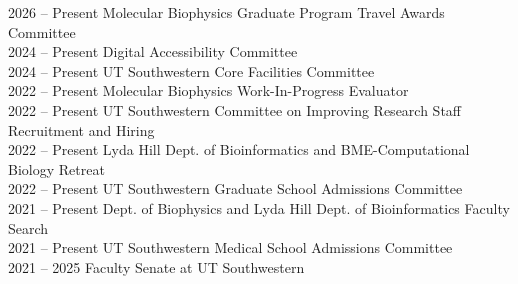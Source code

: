 2026 -- Present \hspace{14pt} Molecular Biophysics Graduate Program Travel Awards Committee \\
2024 -- Present \hspace{14pt} Digital Accessibility Committee \\
2024 -- Present \hspace{14pt} UT Southwestern Core Facilities Committee \\
2022 -- Present \hspace{14pt} Molecular Biophysics Work-In-Progress Evaluator \\
2022 -- Present \hspace{14pt} UT Southwestern Committee on Improving Research Staff Recruitment and Hiring \\
2022 -- Present \hspace{14pt} Lyda Hill Dept. of Bioinformatics and BME-Computational Biology Retreat \\
2022 -- Present \hspace{14pt} UT Southwestern Graduate School Admissions Committee \\
2021 -- Present \hspace{14pt} Dept. of Biophysics and Lyda Hill Dept. of Bioinformatics Faculty Search \\
2021 -- Present \hspace{14pt} UT Southwestern Medical School Admissions Committee \\
2021 -- 2025 \hspace{14pt} Faculty Senate at UT Southwestern \\
\\
